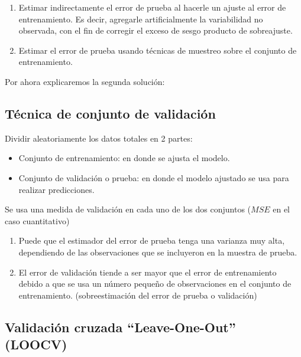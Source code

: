 \documentclass[
  12pt,
]{book}
\providecommand{\tightlist}{%
  \setlength{\itemsep}{0pt}\setlength{\parskip}{0pt}}
\begin{document}
\begin{enumerate}
\def\labelenumi{\alph{enumi}.}
\tightlist
\item
  Estimar indirectamente el error de prueba al hacerle un ajuste al
  error de entrenamiento. Es decir, agregarle artificialmente la
  variabilidad no observada, con el fin de corregir el exceso de sesgo
  producto de sobreajuste.
\item
  Estimar el error de prueba usando técnicas de muestreo sobre el
  conjunto de entrenamiento.
\end{enumerate}

Por ahora explicaremos la segunda solución:

\hypertarget{tuxe9cnica-de-conjunto-de-validaciuxf3n}{%
\subsection{Técnica de conjunto de
validación}\label{tuxe9cnica-de-conjunto-de-validaciuxf3n}}

Dividir aleatoriamente los datos totales en 2 partes:

\begin{itemize}
\tightlist
\item
  Conjunto de entrenamiento: en donde se ajusta el modelo.
\item
  Conjunto de validación o prueba: en donde el modelo ajustado se usa
  para realizar predicciones.
\end{itemize}

Se usa una medida de validación en cada uno de los dos conjuntos
(\(MSE\) en el caso cuantitativo)

\begin{enumerate}
\def\labelenumi{\arabic{enumi}.}
\tightlist
\item
  Puede que el estimador del error de prueba tenga una varianza muy
  alta, dependiendo de las observaciones que se incluyeron en la muestra
  de prueba.
\item
  El error de validación tiende a ser mayor que el error de
  entrenamiento debido a que se usa un número pequeño de observaciones
  en el conjunto de entrenamiento. (sobreestimación del error de prueba
  o validación)
\end{enumerate}

\hypertarget{validaciuxf3n-cruzada-leave-one-out-loocv}{%
\subsection{Validación cruzada ``Leave-One-Out''
(LOOCV)}\label{validaciuxf3n-cruzada-leave-one-out-loocv}}
\end{document}
